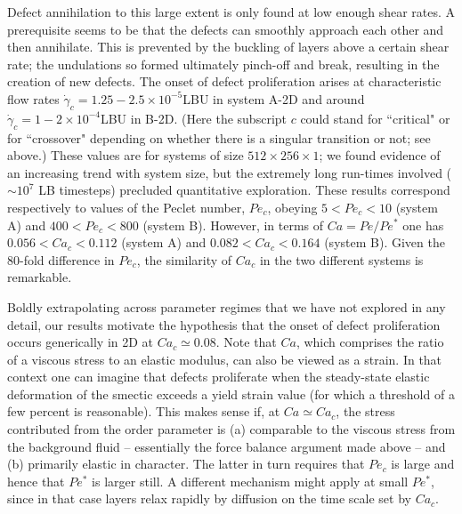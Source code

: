 \documentclass[8.5pt,twoside,twocolumn]{article}
\newcommand{\e}[1]{\times10^{#1}}
\begin{document}
Defect annihilation to this large extent is only found at low enough shear rates. A prerequisite seems to be that the defects can smoothly approach each other and then annihilate. This is prevented by the buckling of layers above a certain shear rate; the undulations so formed ultimately pinch-off and break, resulting in the creation of new defects. The onset of defect proliferation arises at characteristic flow rates $\dot{\gamma}_c=1.25-2.5\e{-5}$LBU in system A-2D and around $\dot{\gamma}_c=1-2\e{-4}$LBU in B-2D. 
(Here the subscript $c$ could stand for ``critical" or for ``crossover" depending on whether there is a singular transition or not; see above.)
These values are for
systems of size $512\times256\times1$; we found evidence of an increasing trend with system size, but the extremely long run-times involved ($\sim 10^7$ LB timesteps) precluded quantitative exploration. These results correspond respectively to values of the Peclet number, $Pe_c$, obeying $5<Pe_c<10$ (system A) and $400<Pe_c<800$ (system B).  However, in terms of $Ca = Pe/Pe^*$ one has $0.056<Ca_c<0.112$ (system A) and $0.082<Ca_c<0.164$ (system B). Given the 80-fold difference in $Pe_c$, the similarity of $Ca_c$ in the two different systems is remarkable.

Boldly extrapolating across parameter regimes that we have not explored in any detail, our results motivate the hypothesis that the onset of defect proliferation occurs generically in 2D at $Ca_c\simeq 0.08$.  Note that $Ca$, which comprises the ratio of a viscous stress to an elastic modulus, can also be viewed as a strain. In that context one can imagine that defects proliferate when the steady-state elastic deformation of the smectic exceeds a yield strain value (for which a threshold of a few percent is reasonable). This makes sense if, at $Ca \simeq Ca_c$, the stress contributed from the order parameter is (a) comparable to the viscous stress from the background fluid -- essentially the force balance argument made above -- and (b) primarily elastic in character. The latter in turn requires that $Pe_c$ is large and hence that $Pe^*$ is larger still. A different mechanism might apply at small $Pe^*$, since in that case layers relax rapidly by diffusion on the time scale set by $Ca_c$.
\end{document}
